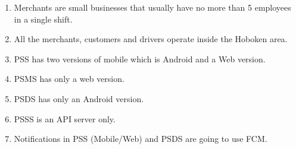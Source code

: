 \begin{enumerate}[resume, label=AS-\arabic*]
    \item Merchants are small businesses that usually have no more 
    than 5 employees in a single shift.
    \item All the merchants, customers and drivers operate inside the 
    Hoboken area.
    \item PSS has two versions of mobile which is Android and a Web version.
    \item PSMS has only a web version.
    \item PSDS has only an Android version.
    \item PSSS is an API server only.
    \item Notifications in PSS (Mobile/Web) and PSDS are going to use FCM.
\end{enumerate}
\pagebreak
